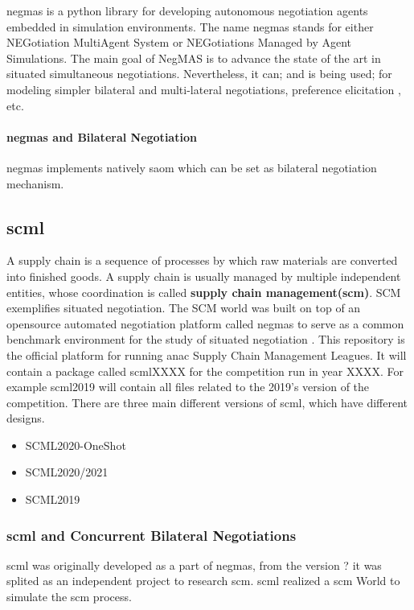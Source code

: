 \gls{negmas} is a python library for developing autonomous negotiation agents embedded in simulation environments. The name negmas stands for either NEGotiation MultiAgent System or NEGotiations Managed by Agent Simulations. The main goal of NegMAS is to advance the state of the art in situated simultaneous negotiations. Nevertheless, it can; and is being used; for modeling simpler bilateral and multi-lateral negotiations, preference elicitation , etc.

\paragraph{\gls{negmas} and Bilateral Negotiation}
\gls{negmas} implements natively \gls{saom} which can be set as bilateral negotiation mechanism.

\subsection{\gls{scml}}
A supply chain is a sequence of processes by which raw materials are converted into finished goods. A supply chain is usually managed by multiple independent entities, whose coordination is called \textbf{supply chain management(\gls{scm})}. SCM exemplifies situated negotiation. The SCM world was built on top of an opensource automated negotiation platform called \gls{negmas} to serve as a common benchmark environment for the study of situated negotiation \parencite{Mohammad2019}. This repository is the official platform for running \gls{anac} Supply Chain Management Leagues. It will contain a package called scmlXXXX for the competition run in year XXXX. For example scml2019 will contain all files related to the 2019’s version of the competition.
There are three main different versions of \gls{scml}, which have different designs.
\begin{itemize}
	\item SCML2020-OneShot
	\item SCML2020/2021
	\item SCML2019
\end{itemize}

\subsubsection{\gls{scml} and Concurrent Bilateral Negotiations}
\gls{scml} was originally developed as a part of \gls{negmas}, from the version ? it was splited as an independent project to research \gls{scm}. \gls{scml} realized a \gls{scm} World to simulate the \gls{scm} process.  

